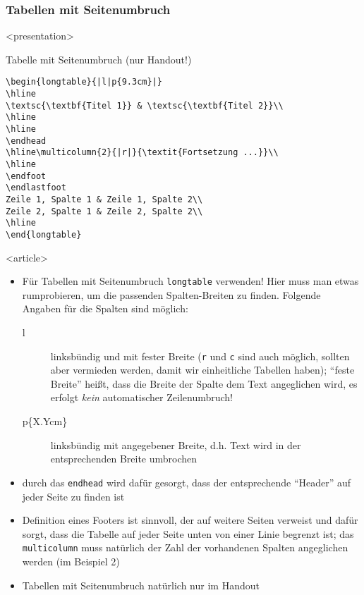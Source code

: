 \begin{frame}[fragile]
\frametitle<presentation>{Tabellen mit Seitenumbruch}


\mode
<presentation>

\begin{block}{Tabelle mit Seitenumbruch (nur Handout!)}
\footnotesize
\begin{verbatim}
\begin{longtable}{|l|p{9.3cm}|}
\hline
\textsc{\textbf{Titel 1}} & \textsc{\textbf{Titel 2}}\\
\hline
\hline
\endhead
\hline\multicolumn{2}{|r|}{\textit{Fortsetzung ...}}\\
\hline
\endfoot
\endlastfoot
Zeile 1, Spalte 1 & Zeile 1, Spalte 2\\
Zeile 2, Spalte 1 & Zeile 2, Spalte 2\\
\hline
\end{longtable}
\end{verbatim}
\normalsize
\end{block}



\mode
<article>

\begin{itemize}
 \item Für Tabellen mit Seitenumbruch \texttt{longtable} verwenden! Hier muss man etwas rumprobieren, um die passenden Spalten-Breiten zu finden. Folgende Angaben für die Spalten sind möglich:
\begin{description}
 \item[l] linksbündig und mit fester Breite (\texttt{r} und \texttt{c} sind auch möglich, sollten aber vermieden werden, damit wir einheitliche Tabellen haben); "`feste Breite"' heißt, dass die Breite der Spalte dem Text angeglichen wird, es erfolgt \textit{kein} automatischer Zeilenumbruch!
 \item[p\{X.Ycm\}] linksbündig mit angegebener Breite, d.h. Text wird in der entsprechenden Breite umbrochen
\end{description}
\item durch das \texttt{endhead} wird dafür gesorgt, dass der entsprechende "`Header"' auf jeder Seite zu finden ist
\item Definition eines Footers ist sinnvoll, der auf weitere Seiten verweist und dafür sorgt, dass die Tabelle auf jeder Seite unten von einer Linie begrenzt ist; das \texttt{multicolumn} muss natürlich der Zahl der vorhandenen Spalten angeglichen werden (im Beispiel 2)
\item Tabellen mit Seitenumbruch natürlich nur im Handout
\end{itemize}


\end{frame}

